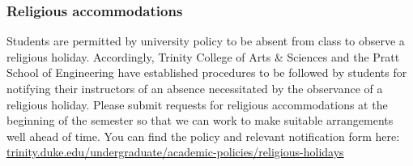 \documentclass[
  letterpaper,
  DIV=11,
  numbers=noendperiod]{scrartcl}
\begin{document}
\subsubsection{Religious accommodations}\label{religious-accommodations}

Students are permitted by university policy to be absent from class to
observe a religious holiday. Accordingly, Trinity College of Arts \&
Sciences and the Pratt School of Engineering have established procedures
to be followed by students for notifying their instructors of an absence
necessitated by the observance of a religious holiday. Please submit
requests for religious accommodations at the beginning of the semester
so that we can work to make suitable arrangements well ahead of time.
You can find the policy and relevant notification form here:
\href{https://trinity.duke.edu/undergraduate/academic-policies/religious-holidays}{trinity.duke.edu/undergraduate/academic-policies/religious-holidays}
\end{document}
